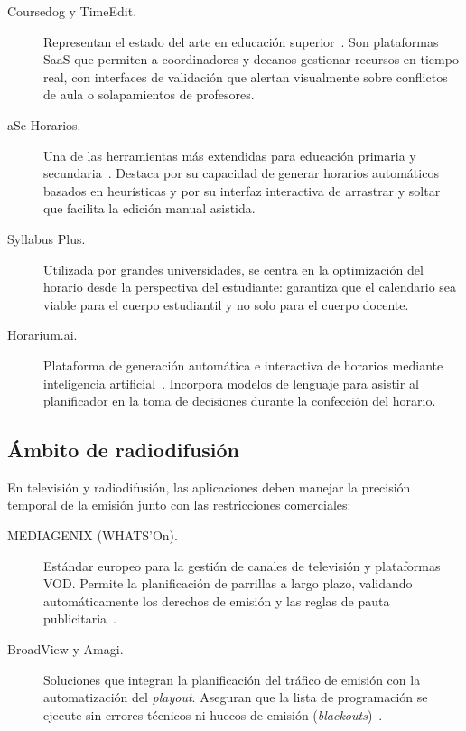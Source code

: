 \begin{description}
  \item[Coursedog y TimeEdit.] Representan el estado del arte en educación
    superior~\cite{bass2021}.  Son plataformas SaaS que permiten a
    coordinadores y decanos gestionar recursos en tiempo real, con interfaces
    de validación que alertan visualmente sobre conflictos de aula o
    solapamientos de profesores.

  \item[aSc Horarios.] Una de las herramientas más extendidas para educación
    primaria y secundaria~\cite{pillay2016}.  Destaca por su capacidad de
    generar horarios automáticos basados en heurísticas y por su interfaz
    interactiva de arrastrar y soltar que facilita la edición manual asistida.

  \item[Syllabus Plus.] Utilizada por grandes universidades, se centra en la
    optimización del horario desde la perspectiva del estudiante: garantiza
    que el calendario sea viable para el cuerpo estudiantil y no solo para
    el cuerpo docente.

  \item[Horarium.ai.] Plataforma de generación automática e interactiva de
    horarios mediante inteligencia artificial~\cite{horarium2024}.  Incorpora
    modelos de lenguaje para asistir al planificador en la toma de decisiones
    durante la confección del horario.
\end{description}

\subsection{\'Ambito de radiodifusi\'on}
\label{ssec:apps-tv}

En televisión y radiodifusión, las aplicaciones deben manejar la precisión
temporal de la emisión junto con las restricciones comerciales:

\begin{description}
  \item[MEDIAGENIX (WHATS'On).] Estándar europeo para la gestión de canales
    de televisión y plataformas VOD.  Permite la planificación de parrillas a
    largo plazo, validando automáticamente los derechos de emisión y las
    reglas de pauta publicitaria~\cite{mediagenix2024}.

  \item[BroadView y Amagi.] Soluciones que integran la planificación del
    tráfico de emisión con la automatización del \textit{playout}.  Aseguran
    que la lista de programación se ejecute sin errores técnicos ni huecos
    de emisión (\textit{blackouts})~\cite{matthews2018}.
\end{description}

